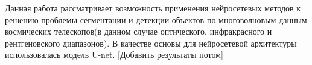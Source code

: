 \Annotation

Данная работа рассматривает возможность применения нейросетевых методов к решению проблемы 
сегментации и детекции объектов по многоволновым данным космических телескопов(в данном случае оптического, 
инфракрасного и рентгеновского диапазонов). В качестве основы для нейросетевой архитектуры использовалась модель 
U-net. [Добавить результаты потом]
